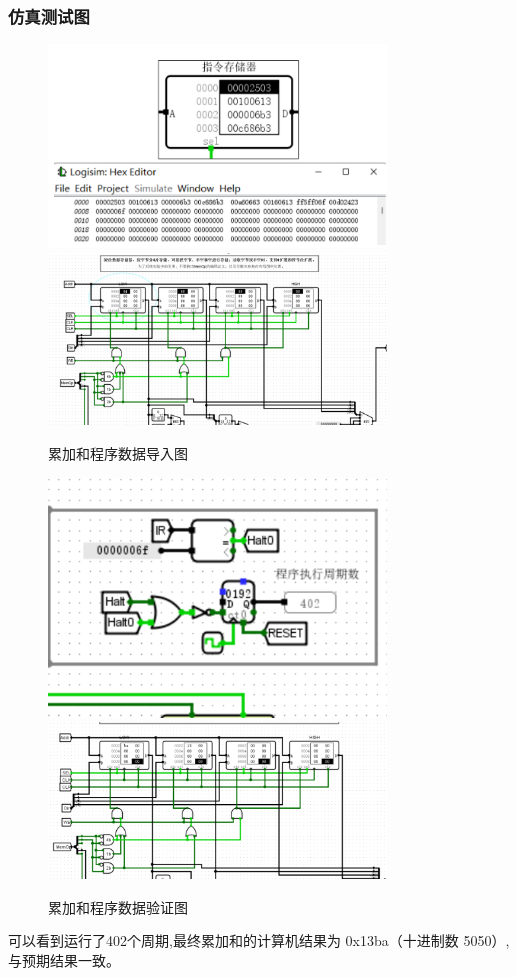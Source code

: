 \documentclass{article}
\begin{document}
    \subsubsection{仿真测试图}
    \begin{figure}[H]
        \centering
        \includegraphics[width=0.8\textwidth]{3.5.1.png}
        \includegraphics[width=0.8\textwidth]{3.5.2.png}
        \caption{累加和程序数据导入图}
    \end{figure}
    \begin{figure}[H]
        \centering
        \includegraphics[width=0.8\textwidth]{3.5.3.png}
        \includegraphics[width=0.8\textwidth]{3.5.4.png}
        \caption{累加和程序数据验证图}
    \end{figure}
    可以看到运行了402个周期,最终累加和的计算机结果为 0x13ba（十进制数 5050）,与预期结果一致。
\end{document}
